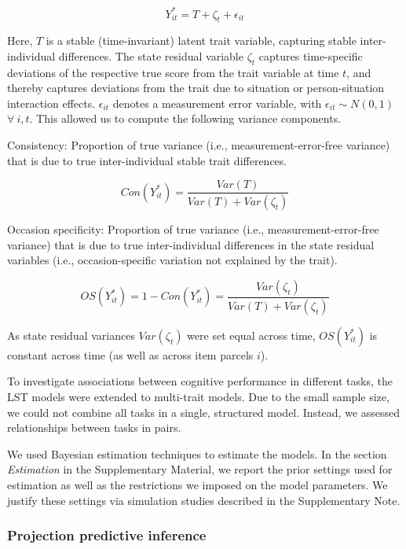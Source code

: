 \documentclass[
  man,floatsintext]{apa6}
\begin{document}
\begin{equation}
Y^*_{it}= T + \zeta_t + \epsilon_{it}
\end{equation}

Here, \(T\) is a stable (time-invariant) latent trait variable, capturing stable inter-individual differences. The state residual variable \(\zeta_t\) captures time-specific deviations of the respective true score from the trait variable at time \(t\), and thereby captures deviations from the trait due to situation or person-situation interaction effects. \(\epsilon_{it}\) denotes a measurement error variable, with \(\epsilon_{it} \sim N(0,1)\) \(\forall~ i,t\). This allowed us to compute the following variance components.

Consistency: Proportion of true variance (i.e., measurement-error-free variance) that is due to true inter-individual stable trait differences.

\begin{equation}
Con(Y^*_{it})=\frac{Var(T)}{Var(T)+Var(\zeta_t)}
\end{equation}

Occasion specificity: Proportion of true variance (i.e., measurement-error-free variance) that is due to true inter-individual differences in the state residual variables (i.e., occasion-specific variation not explained by the trait).

\begin{equation}
OS(Y^*_{it})=1-Con(Y^*_{it}) = \frac{Var(\zeta_t)}{Var(T)+Var(\zeta_t)}
\end{equation}

As state residual variances \(Var(\zeta_t)\) were set equal across time, \(OS(Y^*_{it})\) is constant across time (as well as across item parcels \(i\)).

To investigate associations between cognitive performance in different tasks, the LST models were extended to multi-trait models. Due to the small sample size, we could not combine all tasks in a single, structured model. Instead, we assessed relationships between tasks in pairs.

We used Bayesian estimation techniques to estimate the models. In the section \emph{Estimation} in the Supplementary Material, we report the prior settings used for estimation as well as the restrictions we imposed on the model parameters. We justify these settings via simulation studies described in the Supplementary Note.

\hypertarget{projection-predictive-inference}{%
\subsubsection{Projection predictive inference}\label{projection-predictive-inference}}
\end{document}
